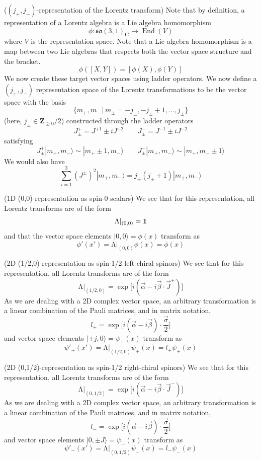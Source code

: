 \vspace{2ex}
\begin{defi}
($(j_{+},j_{-})$-representation of the Lorentz transform) Note that by definition, a representation of a Lorentz algebra is a Lie algebra homomorphism
\[\phi :\mathfrak{so}(3,1)_{{\bm C}}\rightarrow \mathop{\mathrm{End}}(V)\]
where $V$ is the representation space. Note that a Lie algebra homomorphism is a map between two Lie algebras that respects both the vector space structure and the bracket.
\[\phi ([X,Y])=[\phi (X),\phi (Y)]\]
We now create these target vector spaces using ladder operators. We now define a $(j_{+},j_{-})$ representation space of the Lorentz transformations to be the vector space with the basis
\[\{m_{+},m_{-} \,|\, m_{\pm}=-j_{\pm},-j_{\pm}+1,\ldots ,j_{\pm}\}\]
(here, $j_{\pm}\in {\bm Z}_{\geq 0}/2$) constructed through the ladder operators
\[J^{+}_{\pm}=J^{+1}\pm iJ^{+2}\qquad J^{-}_{\pm}=J^{-1}\pm iJ^{-2}\]
satisfying 
\[J^{+}_{\pm}|m_{+},m_{-}\rangle \sim |m_{+}\pm 1,m_{-}\rangle \qquad J^{-}_{\pm}|m_{+},m_{-}\rangle \sim  |m_{+},m_{-}\pm 1\rangle \]
We would also have
	\[\sum _{i=1}^{3}(J^{\pm})^2|m_{+},m_{-}\rangle =j_{\pm}(j_{\pm}+1)|m_{+},m_{-}\rangle \]
\end{defi}
\vspace{2ex}
\begin{ex}
(1D (0,0)-representation as spin-0 scalars) We see that for this representation, all Lorentz transforms are of the form
\[\mathrm{\Lambda }|_{(0,0)}={\bf 1}\]
and that the vector space elements $|0,0\rangle =\phi(x)$ transform as
\[\phi '(x')=\mathrm{\Lambda }|_{(0,0)}\phi (x)=\phi (x)\]	
\end{ex}
\vspace{2ex}
\begin{ex}
(2D (1/2,0)-representation as spin-1/2 left-chiral spinors) We see that for this representation, all Lorentz transforms are of the form
	\[\mathrm{\Lambda }|_{(1/2,0)}=\exp \Big[i(\vec{\alpha }-i\vec{\beta }\cdot \vec{J}^{+})\Big]\]
As we are dealing with a 2D complex vector space, an arbitrary transformation is a linear combination of the Pauli matrices, and in matrix notation,
	\[l_{+}=\exp \Big[i(\vec{\alpha }-i\vec{\beta })\cdot \dfrac{\vec{\sigma }}{2}\Big]\]
	and vector space elements $|\pm j,0\rangle =\psi _{+}(x)$ transform as
	\[\psi '_{+}(x')=\mathrm{\Lambda }|_{(1/2,0)}\psi _{+}(x)=l_{+}\psi _{+}(x)\]
\end{ex}
\vspace{2ex}
\begin{ex}
(2D (0,1/2)-representation as spin-1/2 right-chiral spinors) We see that for this representation, all Lorentz transforms are of the form
	\[\mathrm{\Lambda }|_{(0,1/2)}=\exp \Big[i(\vec{\alpha }-i\vec{\beta }\cdot \vec{J}^{-})\Big]\]
As we are dealing with a 2D complex vector space, an arbitrary transformation is a linear combination of the Pauli matrices, and in matrix notation,
	\[l_{-}=\exp \Big[i(\vec{\alpha }-i\vec{\beta })\cdot \dfrac{\vec{\sigma }}{2}\Big]\]
	and vector space elements $|0,\pm J\rangle =\psi _{-}(x)$ transform as
	\[\psi '_{-}(x')=\mathrm{\Lambda }|_{(0,1/2)}\psi _{-}(x)=l_{-}\psi _{-}(x)\]
\end{ex}
